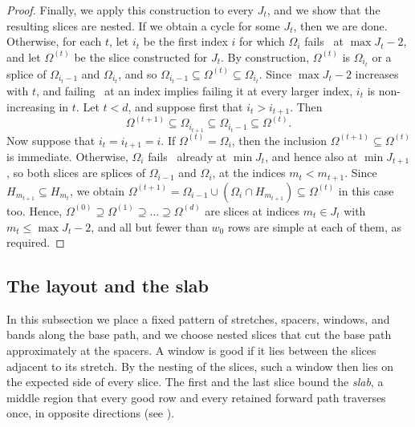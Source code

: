 \documentclass[fontsize=12pt,leading=14pt]{fullpaper}
\begin{document}
\begin{proof}
  Finally, we apply this construction to every $J_t$, and we show that the resulting slices are nested.
  If we obtain a cycle for some $J_t$, then we are done.
  Otherwise, for each $t$, let $i_t$ be the first index $i$ for which $\Omega_i$ fails~ at $\max J_t-2$, and let $\Omega^{(t)}$ be the slice constructed for $J_t$.
  By construction, $\Omega^{(t)}$ is $\Omega_{i_t}$ or a splice of $\Omega_{i_t-1}$ and $\Omega_{i_t}$, and so $\Omega_{i_t-1}\subseteq\Omega^{(t)}\subseteq\Omega_{i_t}$.
  Since $\max J_t-2$ increases with $t$, and failing~ at an index implies failing it at every larger index, $i_t$ is non-increasing in $t$.
  Let $t<d$, and suppose first that $i_t>i_{t+1}$.
  Then
  \[
    \Omega^{(t+1)}\subseteq\Omega_{i_{t+1}}
    \subseteq\Omega_{i_t-1}\subseteq\Omega^{(t)}.
  \]
  Now suppose that $i_t=i_{t+1}=i$.
  If $\Omega^{(t)}=\Omega_i$, then the inclusion $\Omega^{(t+1)}\subseteq\Omega^{(t)}$ is immediate.
  Otherwise, $\Omega_i$ fails~ already at $\min J_t$, and hence also at $\min J_{t+1}$, so both slices are splices of $\Omega_{i-1}$ and $\Omega_i$, at the indices $m_t<m_{t+1}$.
  Since $H_{m_{t+1}}\subseteq H_{m_t}$, we obtain $\Omega^{(t+1)}=\Omega_{i-1}\cup(\Omega_i\cap H_{m_{t+1}})\subseteq\Omega^{(t)}$ in this case too.
  Hence, $\Omega^{(0)}\supseteq\Omega^{(1)}\supseteq\dots\supseteq\Omega^{(d)}$ are slices at indices $m_t\in J_t$ with $m_t\le\max J_t-2$, and all but fewer than $w_0$ rows are simple at each of them, as required.
\end{proof}

%
\newcommand{\Slab}{\mathsf{Slab}}

\subsection{The layout and the slab}\label{sec:stage2-slab}

In this subsection we place a fixed pattern of stretches, spacers, windows, and bands along the base path, and we choose nested slices that cut the base path approximately at the spacers.
A window is good if it lies between the slices adjacent to its stretch.
By the nesting of the slices, such a window then lies on the expected side of every slice.
The first and the last slice bound the \emph{slab}, a middle region that every good row and every retained forward path traverses once, in opposite directions (see ).
\end{document}
